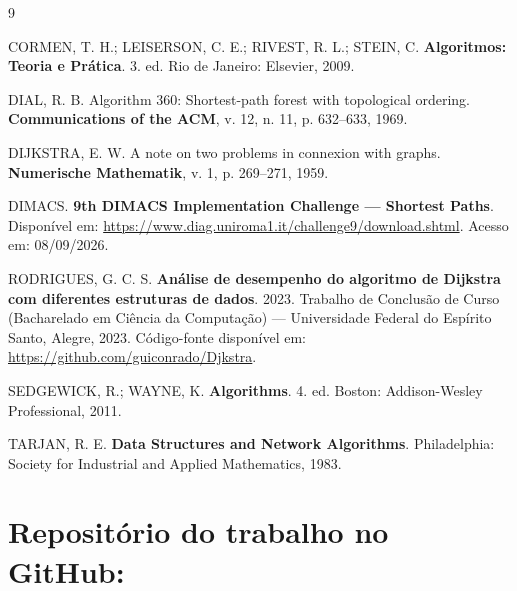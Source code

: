 \documentclass[12pt,a4paper]{article}
\begin{document}
\begin{thebibliography}{9}
\small

CORMEN, T. H.; LEISERSON, C. E.; RIVEST, R. L.; STEIN, C.
\textbf{Algoritmos: Teoria e Prática}. 3. ed. Rio de Janeiro: Elsevier, 2009.

DIAL, R. B. Algorithm 360: Shortest-path forest with topological ordering.
\textbf{Communications of the ACM}, v. 12, n. 11, p. 632--633, 1969.

DIJKSTRA, E. W. A note on two problems in connexion with graphs.
\textbf{Numerische Mathematik}, v. 1, p. 269--271, 1959.

DIMACS. \textbf{9th DIMACS Implementation Challenge --- Shortest Paths}.
Disponível em:
\url{https://www.diag.uniroma1.it/challenge9/download.shtml}.
Acesso em: 08/09/2026.

RODRIGUES, G. C. S. \textbf{Análise de desempenho do algoritmo de Dijkstra com
diferentes estruturas de dados}. 2023. Trabalho de Conclusão de Curso
(Bacharelado em Ciência da Computação) --- Universidade Federal do Espírito
Santo, Alegre, 2023. Código-fonte disponível em:
\url{https://github.com/guiconrado/Djkstra}.

SEDGEWICK, R.; WAYNE, K. \textbf{Algorithms}. 4. ed. Boston: Addison-Wesley
Professional, 2011.

TARJAN, R. E. \textbf{Data Structures and Network Algorithms}. Philadelphia:
Society for Industrial and Applied Mathematics, 1983.

\end{thebibliography}

\section{Repositório do trabalho no GitHub: }

\end{document}
